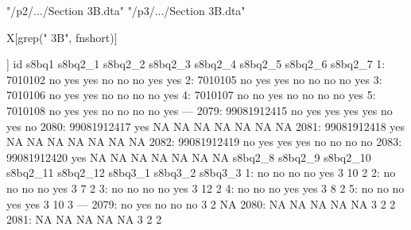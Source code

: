\begin{Schunk}
\begin{Soutput}
[1] "/p2/.../Section 3B.dta" "/p3/.../Section 3B.dta"
\end{Soutput}
\begin{Sinput}
X[grep(" 3B", fnshort)]
\end{Sinput}
\begin{Soutput}
[[1]]
               id s8bq1 s8bq2_1 s8bq2_2 s8bq2_3 s8bq2_4 s8bq2_5 s8bq2_6 s8bq2_7
   1:     7010102    no     yes     yes      no      no      no     yes     yes
   2:     7010105    no     yes     yes      no      no      no      no     yes
   3:     7010106    no     yes     yes      no      no      no      no     yes
   4:     7010107    no      no     yes      no      no      no      no     yes
   5:     7010108    no     yes     yes      no      no      no      no     yes
  ---                                                                          
2079: 99081912415    no     yes     yes     yes     yes      no     yes      no
2080: 99081912417   yes      NA      NA      NA      NA      NA      NA      NA
2081: 99081912418   yes      NA      NA      NA      NA      NA      NA      NA
2082: 99081912419    no     yes     yes     yes      no      no      no      no
2083: 99081912420   yes      NA      NA      NA      NA      NA      NA      NA
      s8bq2_8 s8bq2_9 s8bq2_10 s8bq2_11 s8bq2_12 s8bq3_1 s8bq3_2 s8bq3_3
   1:      no      no       no       no      yes       3      10       2
   2:      no      no       no       no      yes       3       7       2
   3:      no      no       no       no      yes       3      12       2
   4:      no      no       no      yes      yes       3       8       2
   5:      no      no       no      yes      yes       3      10       3
  ---                                                                   
2079:      no     yes       no       no       no       3       2      NA
2080:      NA      NA       NA       NA       NA       3       2       2
2081:      NA      NA       NA       NA       NA       3       2       2

\end{Soutput}
\end{Schunk}

